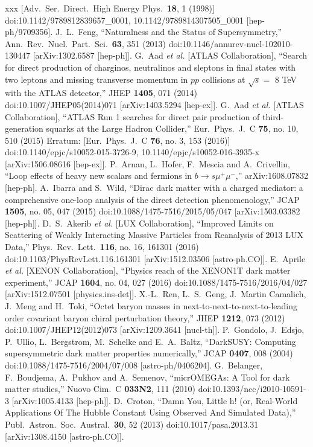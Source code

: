 \begin{thebibliography}{xxx}
  [Adv.\ Ser.\ Direct.\ High Energy Phys.\  {\bf 18}, 1 (1998)]
  doi:10.1142/9789812839657\_0001, 10.1142/9789814307505\_0001
  [hep-ph/9709356].
    J.~L.~Feng,
  ``Naturalness and the Status of Supersymmetry,''
  Ann.\ Rev.\ Nucl.\ Part.\ Sci.\  {\bf 63}, 351 (2013)
  doi:10.1146/annurev-nucl-102010-130447
  [arXiv:1302.6587 [hep-ph]].
    G.~Aad {\it et al.} [ATLAS Collaboration],
  ``Search for direct production of charginos, neutralinos and sleptons in final states with two leptons and missing transverse momentum in $pp$ collisions at $\sqrt{s} =$ 8 TeV with the ATLAS detector,''
  JHEP {\bf 1405}, 071 (2014)
  doi:10.1007/JHEP05(2014)071
  [arXiv:1403.5294 [hep-ex]].
    G.~Aad {\it et al.} [ATLAS Collaboration],
  ``ATLAS Run 1 searches for direct pair production of third-generation squarks at the Large Hadron Collider,''
  Eur.\ Phys.\ J.\ C {\bf 75}, no. 10, 510 (2015)
  Erratum: [Eur.\ Phys.\ J.\ C {\bf 76}, no. 3, 153 (2016)]
  doi:10.1140/epjc/s10052-015-3726-9, 10.1140/epjc/s10052-016-3935-x
  [arXiv:1506.08616 [hep-ex]].
   P.~Arnan, L.~Hofer, F.~Mescia and A.~Crivellin,
  ``Loop effects of heavy new scalars and fermions in $b\to s\mu^+\mu^-$,''
  arXiv:1608.07832 [hep-ph].
    A.~Ibarra and S.~Wild,
  ``Dirac dark matter with a charged mediator: a comprehensive one-loop analysis of the direct detection phenomenology,''
  JCAP {\bf 1505}, no. 05, 047 (2015)
  doi:10.1088/1475-7516/2015/05/047
  [arXiv:1503.03382 [hep-ph]].
    D.~S.~Akerib {\it et al.} [LUX Collaboration],
  ``Improved Limits on Scattering of Weakly Interacting Massive Particles from Reanalysis of 2013 LUX Data,''
  Phys.\ Rev.\ Lett.\  {\bf 116}, no. 16, 161301 (2016)
  doi:10.1103/PhysRevLett.116.161301
  [arXiv:1512.03506 [astro-ph.CO]].
    E.~Aprile {\it et al.} [XENON Collaboration],
  ``Physics reach of the XENON1T dark matter experiment,''
  JCAP {\bf 1604}, no. 04, 027 (2016)
  doi:10.1088/1475-7516/2016/04/027
  [arXiv:1512.07501 [physics.ins-det]].
    X.-L.~Ren, L.~S.~Geng, J.~Martin Camalich, J.~Meng and H.~Toki,
  ``Octet baryon masses in next-to-next-to-next-to-leading order covariant baryon chiral perturbation theory,''
  JHEP {\bf 1212}, 073 (2012)
  doi:10.1007/JHEP12(2012)073
  [arXiv:1209.3641 [nucl-th]].
    P.~Gondolo, J.~Edsjo, P.~Ullio, L.~Bergstrom, M.~Schelke and E.~A.~Baltz,
  ``DarkSUSY: Computing supersymmetric dark matter properties numerically,''
  JCAP {\bf 0407}, 008 (2004)
  doi:10.1088/1475-7516/2004/07/008
  [astro-ph/0406204].
    G.~Belanger, F.~Boudjema, A.~Pukhov and A.~Semenov,
  ``micrOMEGAs: A Tool for dark matter studies,''
  Nuovo Cim.\ C {\bf 033N2}, 111 (2010)
  doi:10.1393/ncc/i2010-10591-3
  [arXiv:1005.4133 [hep-ph]].
    D.~Croton,
  ``Damn You, Little h! (or, Real-World Applications Of The Hubble Constant Using Observed And Simulated Data),''
  Publ.\ Astron.\ Soc.\ Austral.\  {\bf 30}, 52 (2013)
  doi:10.1017/pasa.2013.31
  [arXiv:1308.4150 [astro-ph.CO]].


\end{thebibliography}
